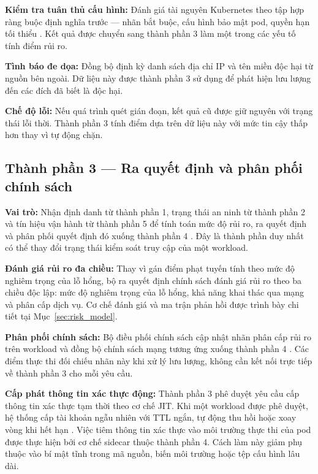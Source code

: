 \textbf{Kiểm tra tuân thủ cấu hình:} Đánh giá tài nguyên Kubernetes theo tập hợp ràng buộc định nghĩa trước --- nhãn bắt buộc, cấu hình bảo mật pod, quyền hạn tối thiểu \parencite{k8s_pod_security_standards,gatekeeper_docs}. Kết quả được chuyển sang thành phần 3 làm một trong các yếu tố tính điểm rủi ro.

\textbf{Tình báo đe dọa:} Đồng bộ định kỳ danh sách địa chỉ IP và tên miền độc hại từ nguồn bên ngoài. Dữ liệu này được thành phần 3 sử dụng để phát hiện lưu lượng đến các đích đã biết là độc hại.

\textbf{Chế độ lỗi:} Nếu quá trình quét gián đoạn, kết quả cũ được giữ nguyên với trạng thái lỗi thời. Thành phần 3 tính điểm dựa trên dữ liệu này với mức tin cậy thấp hơn thay vì tự động chặn.


\subsection{Thành phần 3 — Ra quyết định và phân phối chính sách}

\textbf{Vai trò:} Nhận định danh từ thành phần 1, trạng thái an ninh từ thành phần 2 và tín hiệu vận hành từ thành phần 5 để tính toán mức độ rủi ro, ra quyết định và phân phối quyết định đó xuống thành phần 4 \parencite{nist800207,nist_abac}. Đây là thành phần duy nhất có thể thay đổi trạng thái kiểm soát truy cập của một workload.

\textbf{Đánh giá rủi ro đa chiều:} Thay vì gán điểm phạt tuyến tính theo mức độ nghiêm trọng của lỗ hổng, bộ ra quyết định chính sách đánh giá rủi ro theo ba chiều độc lập: mức độ nghiêm trọng của lỗ hổng, khả năng khai thác qua mạng và phân cấp dịch vụ. Cơ chế đánh giá và ma trận phản hồi được trình bày chi tiết tại Mục~\ref{sec:risk_model}.

\textbf{Phân phối chính sách:} Bộ điều phối chính sách cập nhật nhãn phân cấp rủi ro trên workload và đồng bộ chính sách mạng tương ứng xuống thành phần 4 \parencite{cilium_docs,opa_docs}. Các điểm thực thi đối chiếu nhãn này khi xử lý lưu lượng, không cần kết nối trực tiếp về thành phần 3 cho mỗi yêu cầu.

\textbf{Cấp phát thông tin xác thực động:} Thành phần 3 phê duyệt yêu cầu cấp thông tin xác thực tạm thời theo cơ chế JIT. Khi một workload được phê duyệt, hệ thống cấp tài khoản ngẫu nhiên với TTL ngắn, tự động thu hồi hoặc xoay vòng khi hết hạn \parencite{vault_docs}. Việc tiêm thông tin xác thực vào môi trường thực thi của pod được thực hiện bởi cơ chế sidecar thuộc thành phần 4. Cách làm này giảm phụ thuộc vào bí mật tĩnh trong mã nguồn, biến môi trường hoặc tệp cấu hình lâu dài.

